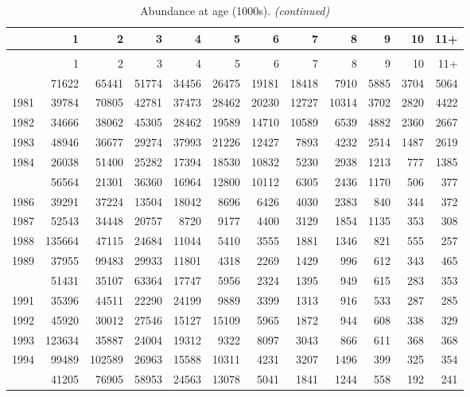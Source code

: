 \documentclass[
]{article}
\begin{document}
\begin{longtable}[t]{lrrrrrrrrrrr}
\caption{\label{tab:NAA-table}Abundance at age (1000s).}\\
\toprule
  & 1 & 2 & 3 & 4 & 5 & 6 & 7 & 8 & 9 & 10 & 11+\\
\midrule
\endfirsthead
\caption[]{Abundance at age (1000s). \textit{(continued)}}\\
\toprule
  & 1 & 2 & 3 & 4 & 5 & 6 & 7 & 8 & 9 & 10 & 11+\\
\midrule
\endhead

\endfoot
\bottomrule
\endlastfoot
1980 & 71622 & 65441 & 51774 & 34456 & 26475 & 19181 & 18418 & 7910 & 5885 & 3704 & 5064\\
1981 & 39784 & 70805 & 42781 & 37473 & 28462 & 20230 & 12727 & 10314 & 3702 & 2820 & 4422\\
1982 & 34666 & 38062 & 45305 & 28462 & 19589 & 14710 & 10589 & 6539 & 4882 & 2360 & 2667\\
1983 & 48946 & 36677 & 29274 & 37993 & 21226 & 12427 & 7893 & 4232 & 2514 & 1487 & 2619\\
1984 & 26038 & 51400 & 25282 & 17394 & 18530 & 10832 & 5230 & 2938 & 1213 & 777 & 1385\\
\addlinespace
1985 & 56564 & 21301 & 36360 & 16964 & 12800 & 10112 & 6305 & 2436 & 1170 & 506 & 377\\
1986 & 39291 & 37224 & 13504 & 18042 & 8696 & 6426 & 4030 & 2383 & 840 & 344 & 372\\
1987 & 52543 & 34448 & 20757 & 8720 & 9177 & 4400 & 3129 & 1854 & 1135 & 353 & 308\\
1988 & 135664 & 47115 & 24684 & 11044 & 5410 & 3555 & 1881 & 1346 & 821 & 555 & 257\\
1989 & 37955 & 99483 & 29933 & 11801 & 4318 & 2269 & 1429 & 996 & 612 & 343 & 465\\
\addlinespace
1990 & 51431 & 35107 & 63364 & 17747 & 5956 & 2324 & 1395 & 949 & 615 & 283 & 353\\
1991 & 35396 & 44511 & 22290 & 24199 & 9889 & 3399 & 1313 & 916 & 533 & 287 & 285\\
1992 & 45920 & 30012 & 27546 & 15127 & 15109 & 5965 & 1872 & 944 & 608 & 338 & 329\\
1993 & 123634 & 35887 & 24004 & 19312 & 9322 & 8097 & 3043 & 866 & 611 & 368 & 368\\
1994 & 99489 & 102589 & 26963 & 15588 & 10311 & 4231 & 3207 & 1496 & 399 & 325 & 354\\
\addlinespace
1995 & 41205 & 76905 & 58953 & 24563 & 13078 & 5041 & 1841 & 1244 & 558 & 192 & 241\\

\end{longtable}
\end{document}
